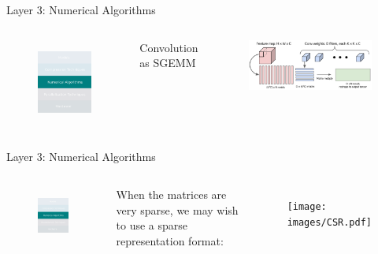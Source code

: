 \documentclass[xcolor=dvipsnames]{beamer}
\begin{document}
\begin{frame}{Layer 3: Numerical Algorithms}

\begin{columns}

\begin{figure}
    \centering
    \includegraphics[width=3.5cm]{images/numericals.pdf}
    \label{fig:inference-stack-nums-2}
\end{figure}


{\large Convolution as SGEMM \footnotemark}

\begin{figure}
    \centering
    \includegraphics[width=8cm]{images/im2col.pdf}
\end{figure}

\end{columns}

\end{frame}


\begin{frame}{Layer 3: Numerical Algorithms}

\begin{columns}


\begin{figure}
    \centering
    \includegraphics[width=3.5cm]{images/numericals.pdf}
    \label{fig:inference-stack-nums-3}
\end{figure}

When the matrices are very sparse, we may wish to use a sparse representation format: 

\begin{figure}
    \centering
    \texttt{[image: images/CSR.pdf]}
\end{figure}

\end{columns}
\end{frame}
\end{document}
